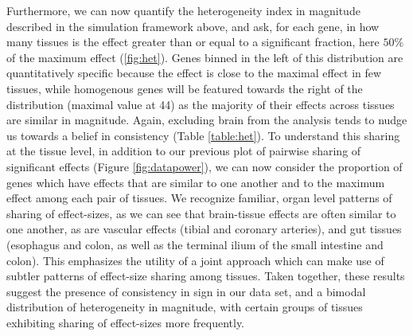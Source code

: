 Furthermore, we can now quantify the heterogeneity index in magnitude described in the simulation framework above, and ask, for each gene, in how many tissues is the effect greater than or equal to a significant fraction, here $50\%$ of the maximum effect (\ref{fig:het}). Genes binned in the left of this distribution are quantitatively specific because the effect is close to the maximal effect in few tissues, while homogenous genes will be featured towards the right of the distribution (maximal value at 44) as the majority of their effects across tissues are similar in magnitude. Again, excluding brain from the analysis tends to nudge us towards a belief in consistency (Table \ref{table:het}). To understand this sharing at the tissue level, in addition to our previous plot of pairwise sharing of significant effects (Figure \ref{fig:datapower}), we can now consider the proportion of genes which have effects that are similar to one another and to the maximum effect among each pair of tissues. We recognize familiar, organ level patterns of sharing of effect-sizes, as we can see that brain-tissue effects are often similar to one another, as are vascular effects (tibial and coronary arteries), and gut tissues (esophagus and colon, as well as the terminal ilium of the small intestine and colon). This emphasizes the utility of a joint approach which can make use of subtler patterns of effect-size sharing among tissues.
Taken together, these results suggest the presence of consistency in sign in our data set, and a bimodal distribution of heterogeneity in magnitude, with certain groups of tissues exhibiting sharing of effect-sizes more frequently.

